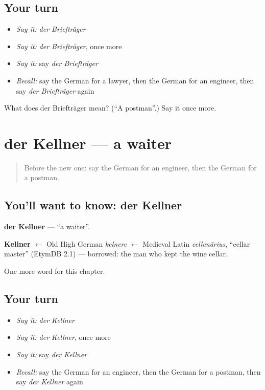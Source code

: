 \subsection*{Your turn}
\begin{itemize}
\raggedright
  \item \emph{Say it:} \emph{der Briefträger}
  \item \emph{Say it:} \emph{der Briefträger}, once more
  \item \emph{Say it:} say \emph{der Briefträger}
  \item \emph{Recall:} say the German for a lawyer, then the German for an engineer, then say \emph{der Briefträger} again
\end{itemize}

\begin{tcolorbox}[breakable,colback=teal!4,colframe=teal!35!black,title={Before you move on}]
What does der Briefträger mean? (\textquotedblleft{}A postman\textquotedblright{}.) Say it once more.
\end{tcolorbox}
\section[der Kellner]{der Kellner — a waiter}

\label{lesson:GE-C126-kellner}



\begin{quote}
Before the new one: say the German for an engineer, then the German for a postman.
\end{quote}

\subsection*{You'll want to know: der Kellner}
\textbf{der Kellner} — \textquotedblleft{}a waiter\textquotedblright{}.

\begin{cousinweb}
\textbf{Kellner} $\leftarrow$ Old High German \emph{kelnere} $\leftarrow$ Medieval Latin \emph{cellenārius}, \textquotedblleft{}cellar master\textquotedblright{} (EtymDB 2.1) — borrowed: the man who kept the wine cellar.
\end{cousinweb}

\begin{grammarlens}[title={What you've built}]
One more word for this chapter.
\end{grammarlens}

\subsection*{Your turn}
\begin{itemize}
\raggedright
  \item \emph{Say it:} \emph{der Kellner}
  \item \emph{Say it:} \emph{der Kellner}, once more
  \item \emph{Say it:} say \emph{der Kellner}
  \item \emph{Recall:} say the German for an engineer, then the German for a postman, then say \emph{der Kellner} again
\end{itemize}


